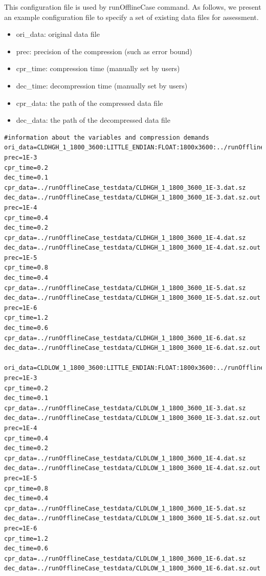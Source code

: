 This configuration file is used by runOfflineCase command.
As follows, we present an example configuration file to specify a set of existing data files for assessment.
\begin{itemize}
  \item ori\_data: original data file
  \item prec: precision of the compression (such as error bound)
  \item cpr\_time: compression time (manually set by users)
  \item dec\_time: decompression time (manually set by users)
  \item cpr\_data: the path of the compressed data file
  \item dec\_data: the path of the decompressed data file
\end{itemize}
\begin{lstlisting}[style=ShellStyleInline, basicstyle =\footnotesize\ttfamily]
#information about the variables and compression demands
ori_data=CLDHGH_1_1800_3600:LITTLE_ENDIAN:FLOAT:1800x3600:../runOfflineCase_testdata/CLDHGH_1_1800_3600.dat
prec=1E-3
cpr_time=0.2
dec_time=0.1
cpr_data=../runOfflineCase_testdata/CLDHGH_1_1800_3600_1E-3.dat.sz
dec_data=../runOfflineCase_testdata/CLDHGH_1_1800_3600_1E-3.dat.sz.out
prec=1E-4
cpr_time=0.4
dec_time=0.2
cpr_data=../runOfflineCase_testdata/CLDHGH_1_1800_3600_1E-4.dat.sz
dec_data=../runOfflineCase_testdata/CLDHGH_1_1800_3600_1E-4.dat.sz.out
prec=1E-5
cpr_time=0.8
dec_time=0.4
cpr_data=../runOfflineCase_testdata/CLDHGH_1_1800_3600_1E-5.dat.sz
dec_data=../runOfflineCase_testdata/CLDHGH_1_1800_3600_1E-5.dat.sz.out
prec=1E-6
cpr_time=1.2
dec_time=0.6
cpr_data=../runOfflineCase_testdata/CLDHGH_1_1800_3600_1E-6.dat.sz
dec_data=../runOfflineCase_testdata/CLDHGH_1_1800_3600_1E-6.dat.sz.out

ori_data=CLDLOW_1_1800_3600:LITTLE_ENDIAN:FLOAT:1800x3600:../runOfflineCase_testdata/CLDLOW_1_1800_3600.dat
prec=1E-3
cpr_time=0.2
dec_time=0.1
cpr_data=../runOfflineCase_testdata/CLDLOW_1_1800_3600_1E-3.dat.sz
dec_data=../runOfflineCase_testdata/CLDLOW_1_1800_3600_1E-3.dat.sz.out
prec=1E-4
cpr_time=0.4
dec_time=0.2
cpr_data=../runOfflineCase_testdata/CLDLOW_1_1800_3600_1E-4.dat.sz
dec_data=../runOfflineCase_testdata/CLDLOW_1_1800_3600_1E-4.dat.sz.out
prec=1E-5
cpr_time=0.8
dec_time=0.4
cpr_data=../runOfflineCase_testdata/CLDLOW_1_1800_3600_1E-5.dat.sz
dec_data=../runOfflineCase_testdata/CLDLOW_1_1800_3600_1E-5.dat.sz.out
prec=1E-6
cpr_time=1.2
dec_time=0.6
cpr_data=../runOfflineCase_testdata/CLDLOW_1_1800_3600_1E-6.dat.sz
dec_data=../runOfflineCase_testdata/CLDLOW_1_1800_3600_1E-6.dat.sz.out
\end{lstlisting}

